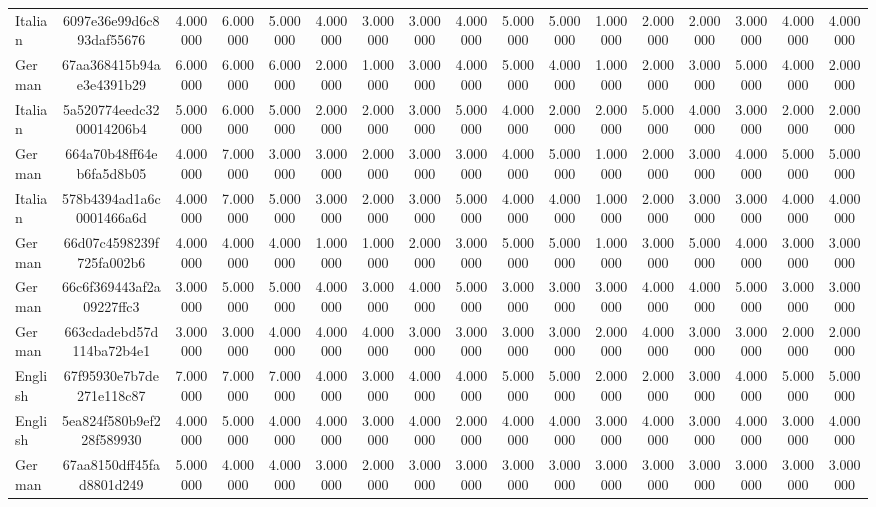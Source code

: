 \begin{table}[htbp]
\begin{tabular}{lcccccccccccccccc}
Italian & 6097e36e99d6c893daf55676 & 4.000000 & 6.000000 & 5.000000 & 4.000000 & 3.000000 & 3.000000 & 4.000000 & 5.000000 & 5.000000 & 1.000000 & 2.000000 & 2.000000 & 3.000000 & 4.000000 & 4.000000 \\
German & 67aa368415b94ae3e4391b29 & 6.000000 & 6.000000 & 6.000000 & 2.000000 & 1.000000 & 3.000000 & 4.000000 & 5.000000 & 4.000000 & 1.000000 & 2.000000 & 3.000000 & 5.000000 & 4.000000 & 2.000000 \\
Italian & 5a520774eedc3200014206b4 & 5.000000 & 6.000000 & 5.000000 & 2.000000 & 2.000000 & 3.000000 & 5.000000 & 4.000000 & 2.000000 & 2.000000 & 5.000000 & 4.000000 & 3.000000 & 2.000000 & 2.000000 \\
German & 664a70b48ff64eb6fa5d8b05 & 4.000000 & 7.000000 & 3.000000 & 3.000000 & 2.000000 & 3.000000 & 3.000000 & 4.000000 & 5.000000 & 1.000000 & 2.000000 & 3.000000 & 4.000000 & 5.000000 & 5.000000 \\
Italian & 578b4394ad1a6c0001466a6d & 4.000000 & 7.000000 & 5.000000 & 3.000000 & 2.000000 & 3.000000 & 5.000000 & 4.000000 & 4.000000 & 1.000000 & 2.000000 & 3.000000 & 3.000000 & 4.000000 & 4.000000 \\
German & 66d07c4598239f725fa002b6 & 4.000000 & 4.000000 & 4.000000 & 1.000000 & 1.000000 & 2.000000 & 3.000000 & 5.000000 & 5.000000 & 1.000000 & 3.000000 & 5.000000 & 4.000000 & 3.000000 & 3.000000 \\
German & 66c6f369443af2a09227ffc3 & 3.000000 & 5.000000 & 5.000000 & 4.000000 & 3.000000 & 4.000000 & 5.000000 & 3.000000 & 3.000000 & 3.000000 & 4.000000 & 4.000000 & 5.000000 & 3.000000 & 3.000000 \\
German & 663cdadebd57d114ba72b4e1 & 3.000000 & 3.000000 & 4.000000 & 4.000000 & 4.000000 & 3.000000 & 3.000000 & 3.000000 & 3.000000 & 2.000000 & 4.000000 & 3.000000 & 3.000000 & 2.000000 & 2.000000 \\
English & 67f95930e7b7de271e118c87 & 7.000000 & 7.000000 & 7.000000 & 4.000000 & 3.000000 & 4.000000 & 4.000000 & 5.000000 & 5.000000 & 2.000000 & 2.000000 & 3.000000 & 4.000000 & 5.000000 & 5.000000 \\
English & 5ea824f580b9ef228f589930 & 4.000000 & 5.000000 & 4.000000 & 4.000000 & 3.000000 & 4.000000 & 2.000000 & 4.000000 & 4.000000 & 3.000000 & 4.000000 & 3.000000 & 4.000000 & 3.000000 & 4.000000 \\
German & 67aa8150dff45fad8801d249 & 5.000000 & 4.000000 & 4.000000 & 3.000000 & 2.000000 & 3.000000 & 3.000000 & 3.000000 & 3.000000 & 3.000000 & 3.000000 & 3.000000 & 3.000000 & 3.000000 & 3.000000 \\

\end{tabular}
\end{table}
